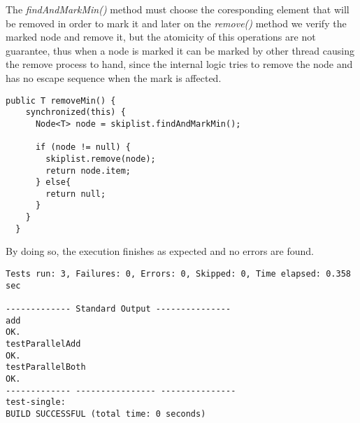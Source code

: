 \par
The \textit{findAndMarkMin()} method must choose the coresponding element that will be removed in order to mark it and later on the \textit{remove()} method we verify the marked node and remove it, but the atomicity of this operations are not guarantee, thus when a node is marked it can be marked by other thread causing the remove process to hand, since the internal logic tries to remove the node and has no escape sequence when the mark is affected.
\par
\begin{lstlisting}[frame=single,breaklines=true]
  public T removeMin() {
    synchronized(this) {
      Node<T> node = skiplist.findAndMarkMin();
    
      if (node != null) {
        skiplist.remove(node);
        return node.item;
      } else{
        return null;
      }
    }
  }
\end{lstlisting}
\par
By doing so, the execution finishes as expected and no errors are found.
\begin{lstlisting}[frame=single,breaklines=true]
Tests run: 3, Failures: 0, Errors: 0, Skipped: 0, Time elapsed: 0.358 sec

------------- Standard Output ---------------
add
OK.
testParallelAdd
OK.
testParallelBoth
OK.
------------- ---------------- ---------------
test-single:
BUILD SUCCESSFUL (total time: 0 seconds)
\end{lstlisting}
